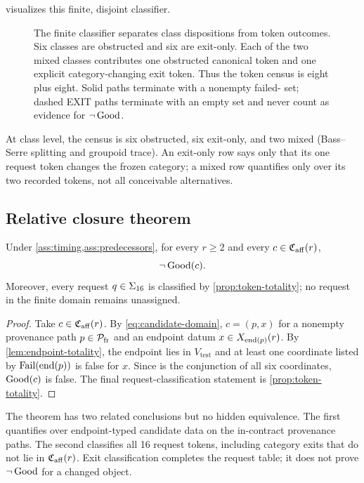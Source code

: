  visualizes this finite, disjoint classifier.

\begin{figure}[H]
  \centering
  \resizebox{0.96\textwidth}{!}{}
  \caption{The finite classifier separates class dispositions from token
  outcomes.  Six classes are obstructed and six are exit-only.  Each of the two
  mixed classes contributes one obstructed canonical token and one explicit
  category-changing exit token.  Thus the token census is eight plus eight.
  Solid paths terminate with a nonempty failed-\Good{} set; dashed EXIT paths
  terminate with an empty set and never count as evidence for $\neg\operatorname{Good}$.}
  \label{fig:classification}
\end{figure}

At class level, the census is six obstructed, six exit-only, and two mixed
(Bass--Serre splitting and groupoid trace).  An exit-only row says only that its
one request token changes the frozen category; a mixed row quantifies only over
its two recorded tokens, not all conceivable alternatives.

\subsection{Relative closure theorem}

\begin{theorem}
\label{thm:closure}
Under \cref{ass:timing,ass:predecessors}, for every $r\ge2$ and every
$c\in\mathfrak{C}_{\mathrm{aff}}(r)$,
\[
\neg\operatorname{Good}(c).
\]
Moreover, every request $q\in\Sigma_{16}$ is classified by
\cref{prop:token-totality}; no request in the finite domain remains unassigned.
\end{theorem}

\begin{proof}
Take $c\in\mathfrak{C}_{\mathrm{aff}}(r)$.  By \cref{eq:candidate-domain}, $c=(p,x)$ for a nonempty
provenance path $p\in\mathcal{P}_{\mathrm{fr}}$ and an endpoint datum
$x\in X_{\operatorname{end}(p)}(r)$.  By \cref{lem:endpoint-totality}, the endpoint lies in
$V_{\mathrm{test}}$ and at least one coordinate listed by
$\operatorname{Fail}(\operatorname{end}(p))$ is false for $x$.  Since \Good{} is the conjunction of all
six coordinates, $\operatorname{Good}(c)$ is false.  The final request-classification
statement is \cref{prop:token-totality}.
\end{proof}

The theorem has two related conclusions but no hidden equivalence.  The first
quantifies over endpoint-typed candidate data on the in-contract provenance
paths.  The second classifies all 16 request tokens, including category exits
that do not lie in $\mathfrak{C}_{\mathrm{aff}}(r)$.  Exit classification completes the request table;
it does not prove $\neg\operatorname{Good}$ for a changed object.

